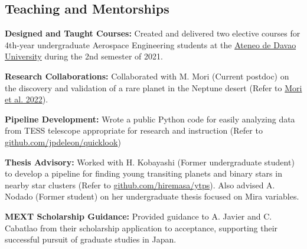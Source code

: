 \documentclass[12pt,letterpaper]{article}
\begin{document}
\subsection{Teaching and Mentorships}
\begin{list}{}{\cvlist}
    \item \textbf{Designed and Taught Courses:} Created and delivered two elective courses for 4th-year undergraduate Aerospace Engineering students at the \href{http://sea.addu.edu.ph/programs/aerospace-engineering/}{Ateneo de Davao University} during the 2nd semester of 2021.
    \item \textbf{Research Collaborations:} Collaborated with M. Mori (Current postdoc) on the discovery and validation of a rare planet in the Neptune desert (Refer to \href{https://ui.adsabs.harvard.edu/abs/2022AJ....163..298M/abstract}{Mori et al. 2022}).%
    \item \textbf{Pipeline Development:} Wrote a public Python code for easily analyzing data from TESS telescope appropriate for research and instruction (Refer to \href{https://github.com/jpdeleon/quicklook}{github.com/jpdeleon/quicklook})
    \item \textbf{Thesis Advisory:} Worked with H. Kobayashi (Former undergraduate student) to develop a pipeline for finding young transiting planets and binary stars in nearby star clusters (Refer to \href{https://github.com/hiremasa/ytps}{github.com/hiremasa/ytps}). Also advised A. Nodado (Former student) on her undergraduate thesis focused on Mira variables.
    \item \textbf{MEXT Scholarship Guidance:} Provided guidance to A. Javier and C. Cabatlao from their scholarship application to acceptance, supporting their successful pursuit of graduate studies in Japan.
\end{list}
\end{document}
